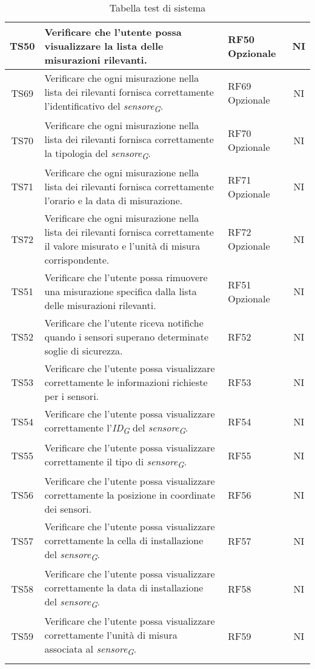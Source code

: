 \begin{longtable}{|c|p{5cm}|>{\raggedright}p{2cm}|c|}
        \hline
        TS50 & Verificare che l'utente possa visualizzare la lista delle misurazioni rilevanti. & RF50 Opzionale & NI \\
        \hline
        TS69 & Verificare che ogni misurazione nella lista dei rilevanti fornisca correttamente l'identificativo del \textit{sensore}\textsubscript{\textit{G}}. & RF69 Opzionale & NI \\
        \hline
        TS70 & Verificare che ogni misurazione nella lista dei rilevanti fornisca correttamente la tipologia del \textit{sensore}\textsubscript{\textit{G}}. & RF70 Opzionale & NI \\
        \hline
        TS71 & Verificare che ogni misurazione nella lista dei rilevanti fornisca correttamente l'orario e la data di misurazione. & RF71 Opzionale & NI \\
        \hline
        TS72 & Verificare che ogni misurazione nella lista dei rilevanti fornisca correttamente il valore misurato e l'unità di misura corrispondente. & RF72 Opzionale & NI \\
        \hline
        TS51 & Verificare che l'utente possa rimuovere una misurazione specifica dalla lista delle misurazioni rilevanti. & RF51 Opzionale & NI \\
        \hline
        TS52 & Verificare che l'utente riceva notifiche quando i sensori superano determinate soglie di sicurezza. & RF52 & NI \\
        \hline
        TS53 & Verificare che l'utente possa visualizzare correttamente le informazioni richieste per i sensori. & RF53 & NI \\
        \hline
        TS54 & Verificare che l'utente possa visualizzare correttamente l'\textit{ID}\textsubscript{\textit{G}} del \textit{sensore}\textsubscript{\textit{G}}. & RF54 & NI \\
        \hline
        TS55 & Verificare che l'utente possa visualizzare correttamente il tipo di \textit{sensore}\textsubscript{\textit{G}}. & RF55 & NI \\
        \hline
        TS56 & Verificare che l'utente possa visualizzare correttamente la posizione in coordinate dei sensori. & RF56 & NI \\
        \hline
        TS57 & Verificare che l'utente possa visualizzare correttamente la cella di installazione del \textit{sensore}\textsubscript{\textit{G}}. & RF57 & NI \\
        \hline
        TS58 & Verificare che l'utente possa visualizzare correttamente la data di installazione del \textit{sensore}\textsubscript{\textit{G}}. & RF58 & NI \\
        \hline
        TS59 & Verificare che l'utente possa visualizzare correttamente l'unità di misura associata al \textit{sensore}\textsubscript{\textit{G}}. & RF59 & NI \\
        \hline
    \caption{Tabella test di sistema}
\end{longtable}